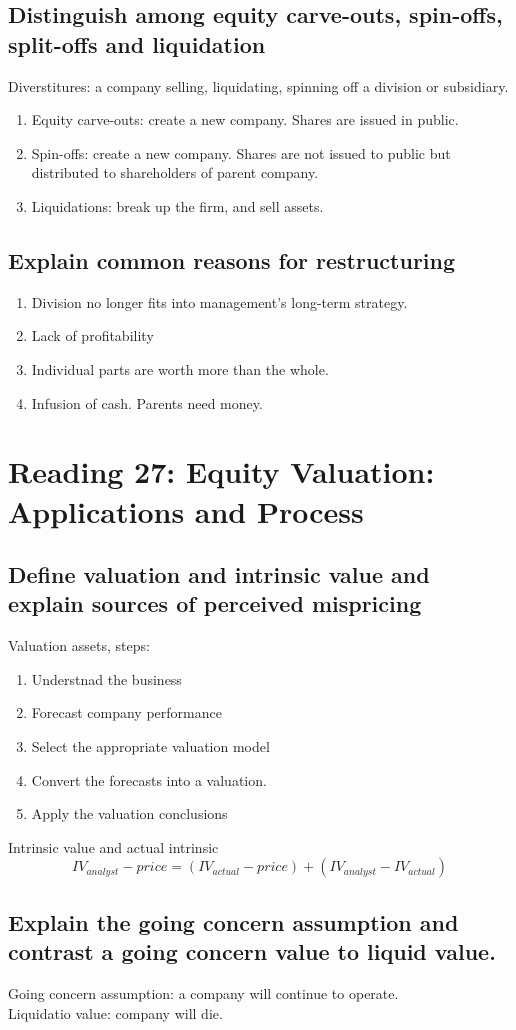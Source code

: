 \documentclass{article}
\newcommand{\be}{\begin{enumerate}}
\newcommand{\ee}{\end{enumerate}}
\begin{document}
\subsection{Distinguish among equity carve-outs, spin-offs, split-offs and liquidation}
    Diverstitures: a company selling, liquidating, spinning off a division  or subsidiary.
\be
    \item Equity carve-outs: create a new company. Shares are issued in public. 
    \item Spin-offs: create a new company. Shares are not issued to public but distributed
        to shareholders of parent company.
    \item Liquidations: break up the firm, and sell assets.
\ee
\subsection{Explain common reasons for restructuring}
\be
    \item Division no longer fits into management's long-term strategy.
    \item Lack of profitability
    \item Individual parts are worth more than the whole.
    \item Infusion of cash. Parents need money.
\ee

\section{Reading 27: Equity Valuation: Applications and Process}
\subsection{Define valuation and intrinsic value and explain sources of
perceived mispricing}
Valuation assets, steps:
\be
    \item Understnad the business
    \item Forecast company performance
    \item Select the appropriate valuation model
    \item Convert the forecasts into a valuation.
    \item Apply the valuation conclusions
\ee
Intrinsic value and actual intrinsic
$$
    IV_{analyst}-price=(IV_{actual}-price)+(IV_{analyst}-IV_{actual})
$$
\subsection{Explain the going concern assumption and contrast a going concern value
to liquid value.}
Going concern assumption: a company will continue to operate.
\\Liquidatio value: company will die.
\end{document}

